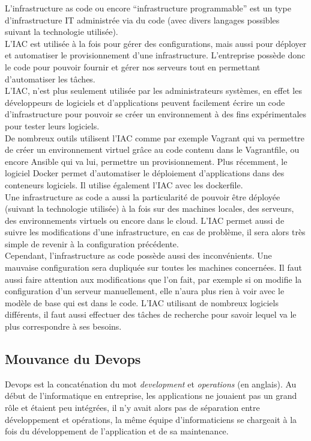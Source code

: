 \documentclass[]{article}
\begin{document}
L'infrastructure as code ou encore ``infrastructure programmable'' est
un type d'infrastructure IT administrée via du code (avec divers langages
possibles suivant la technologie utilisée). \\
L'IAC est utilisée à la fois pour gérer des configurations, mais aussi pour déployer et automatiser le
provisionnement d'une infrastructure. L'entreprise possède donc le code
pour pouvoir fournir et gérer nos serveurs tout en permettant
d'automatiser les tâches. \\
L'IAC, n'est plus seulement utilisée par les administrateurs systèmes, en effet les développeurs de logiciels et d'applications
peuvent facilement écrire un code d'infrastructure pour pouvoir se créer
un environnement à des fins expérimentales pour tester leurs logiciels.\\
De nombreux outils utilisent l'IAC comme par exemple Vagrant qui va
permettre de créer un environnement virtuel grâce au code contenu dans
le Vagrantfile, ou encore Ansible qui va lui, permettre un
provisionnement. Plus récemment, le logiciel Docker permet
d'automatiser le déploiement d'applications dans des conteneurs
logiciels. Il utilise également l'IAC avec les dockerfile. \\
Une infrastructure as code a aussi la particularité de pouvoir être déployée
(suivant la technologie utilisée) à la fois sur des machines
locales, des serveurs, des environnements virtuels ou encore dans le
cloud. L'IAC permet aussi de suivre les modifications d'une
infrastructure, en cas de problème, il sera alors très simple de revenir
à la configuration précédente. \\
Cependant, l'infrastructure as code possède aussi des inconvénients. Une mauvaise configuration sera
dupliquée sur toutes les machines concernées. Il faut aussi faire
attention aux modifications que l'on fait, par exemple si on modifie la
configuration d'un serveur manuellement, elle n'aura plus rien à voir
avec le modèle de base qui est dans le code. L'IAC utilisant de nombreux
logiciels différents, il faut aussi effectuer des tâches de recherche
pour savoir lequel va le plus correspondre à ses besoins.

\subsection{Mouvance du Devops}\label{mouvance-devops}

Devops est la concaténation du mot \emph{development} et
\emph{operations} (en anglais). Au début de l'informatique en
entreprise, les applications ne jouaient pas un grand rôle et étaient
peu intégrées, il n'y avait alors pas de séparation entre développement
et opérations, la même équipe d'informaticiens se chargeait à la fois du
développement de l'application et de sa maintenance.
\end{document}
